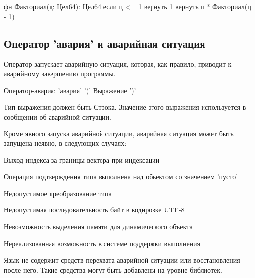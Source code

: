 \begin{Trivil}
фн Факториал(ц: Цел64): Цел64 {
    если ц <= 1 { вернуть 1 }
    вернуть ц * Факториал(ц - 1)
}
\end{Trivil}

\hypertarget{crash-stmt}{%
\subsection{Оператор 'авария' и аварийная ситуация}\label{stmt:crash-stmt}}

Оператор  запускает аварийную ситуация, которая, как правило, приводит к аварийному завершению программы. 

\begin{Grammar}
Оператор-авария: 'авария' '(' Выражение ')'
\end{Grammar}

Тип выражения должен быть Строка. Значение этого выражения используется в сообщении об аварийной ситуации.

Кроме явного запуска аварийной ситуации, аварийная ситуация может быть запущена неявно, в следующих случаях:
\begin{d_itemize}
\item
    Выход индекса за границы вектора при индексации
\item
    Операция подтверждения типа выполнена над объектом со значением 'пусто'
\item
    Недопустимое преобразование типа 
\item
    Недопустимая последовательность байт в кодировке UTF-8
\item
    Невозможность выделения памяти для динамического объекта
\item
    Нереализованная возможность в системе поддержки выполнения
\end{d_itemize}

\bigskip
Язык \thelang{} не содержит средств перехвата аварийной ситуации или восстановления после него. 
Такие средства могут быть добавлены на уровне библиотек.
